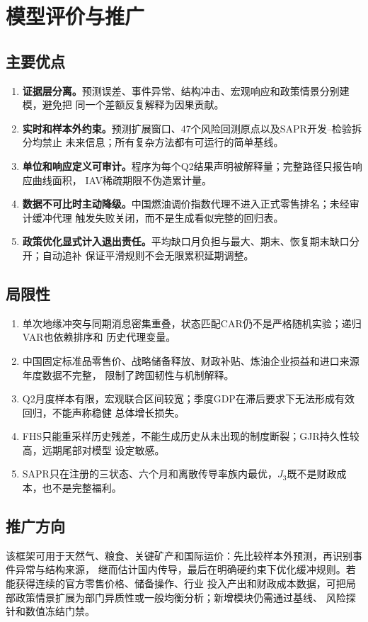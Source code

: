 \section{模型评价与推广}

\subsection{主要优点}

\begin{enumerate}
  \item \textbf{证据层分离。}预测误差、事件异常、结构冲击、宏观响应和政策情景分别建模，避免把
  同一个差额反复解释为因果贡献。
  \item \textbf{实时和样本外约束。}预测扩展窗口、47个风险回测原点以及SAPR开发--检验拆分均禁止
  未来信息；所有复杂方法都有可运行的简单基线。
  \item \textbf{单位和响应定义可审计。}程序为每个Q2结果声明被解释量；完整路径只报告响应曲线面积，
  IAV稀疏期限不伪造累计量。
  \item \textbf{数据不可比时主动降级。}中国燃油调价指数代理不进入正式零售排名；未经审计缓冲代理
  触发失败关闭，而不是生成看似完整的回归表。
  \item \textbf{政策优化显式计入退出责任。}平均缺口月负担与最大、期末、恢复期末缺口分开；自动追补
  保证平滑规则不会无限累积延期调整。
\end{enumerate}

\subsection{局限性}

\begin{enumerate}
  \item 单次地缘冲突与同期消息密集重叠，状态匹配CAR仍不是严格随机实验；递归VAR也依赖排序和
  历史代理变量。
  \item 中国固定标准品零售价、战略储备释放、财政补贴、炼油企业损益和进口来源年度数据不完整，
  限制了跨国韧性与机制解释。
  \item Q2月度样本有限，宏观联合区间较宽；季度GDP在滞后要求下无法形成有效回归，不能声称稳健
  总体增长损失。
  \item FHS只能重采样历史残差，不能生成历史从未出现的制度断裂；GJR持久性较高，远期尾部对模型
  设定敏感。
  \item SAPR只在注册的三状态、六个月和离散传导率族内最优，$J_3$既不是财政成本，也不是完整福利。
\end{enumerate}

\subsection{推广方向}

该框架可用于天然气、粮食、关键矿产和国际运价：先比较样本外预测，再识别事件异常与结构来源，
继而估计国内传导，最后在明确硬约束下优化缓冲规则。若能获得连续的官方零售价格、储备操作、行业
投入产出和财政成本数据，可把局部政策情景扩展为部门异质性或一般均衡分析；新增模块仍需通过基线、
风险探针和数值冻结门禁。
